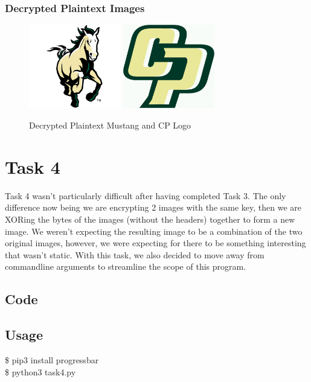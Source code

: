 \documentclass[11pt]{article}
\begin{document}
  \subsubsection{Decrypted Plaintext Images}
    \begin{figure}[!h]
      \centering
      \includegraphics[width=4cm]{Images/mustang.jpg}
      \includegraphics[width=4cm]{Images/cp-logo.jpg}
      \caption{Decrypted Plaintext Mustang and CP Logo}
      \label{fig:Decrypted_Plaintext_Images}
    \end{figure}

\section{Task 4}
  Task 4 wasn't particularly difficult after having completed Task 3. The only
  difference now being we are encrypting 2 images with the same key, then we are
  XORing the bytes of the images (without the headers) together to form a new image.
  We weren't expecting the resulting image to be a combination of the two original images, 
  however, we were expecting for there to be something interesting that wasn't static. 
  With this task, we also decided to move away from commandline arguments to
  streamline the scope of this program. 
  \subsection{Code}
    
  \subsection{Usage}
    {\tt\begin{tabbing}                                                                                                                                                                     
      \$ pip3 install progressbar\\
      \$ python3 task4.py\\
      \end{tabbing}}
\end{document}
